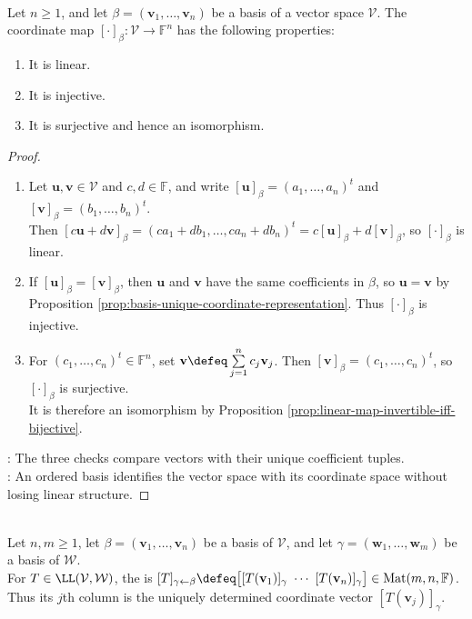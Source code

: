 \begin{proposition} \label{prop:coordinate-map-isomorphism} \\
Let $n\geq1$, and let $\beta=(\mathbf{v}_1,\ldots,\mathbf{v}_n)$ be a basis of a vector space $\mathcal{V}$. The coordinate map $[\cdot]_{\beta}:\mathcal{V}\to\mathbb{F}^n$ has the following properties:
\begin{enumerate}[label=(\roman*)]
\setlength{\itemsep}{0pt}
\item It is linear.
\item It is injective.
\item It is surjective and hence an isomorphism.
\end{enumerate}
\begin{proof}
\begin{enumerate}[label=(\roman*)]
\setlength{\itemsep}{0pt}
\item Let $\mathbf{u},\mathbf{v}\in\mathcal{V}$ and $c,d\in\mathbb{F}$, and write $[\mathbf{u}]_{\beta}=(a_1,\ldots,a_n)^t$ and $[\mathbf{v}]_{\beta}=(b_1,\ldots,b_n)^t$.\\
Then $[c\mathbf{u}+d\mathbf{v}]_{\beta}=(ca_1+db_1,\ldots,ca_n+db_n)^t=c[\mathbf{u}]_{\beta}+d[\mathbf{v}]_{\beta}$, so $[\cdot]_{\beta}$ is linear.
\item If $[\mathbf{u}]_{\beta}=[\mathbf{v}]_{\beta}$, then $\mathbf{u}$ and $\mathbf{v}$ have the same coefficients in $\beta$, so $\mathbf{u}=\mathbf{v}$ by Proposition \ref{prop:basis-unique-coordinate-representation}. Thus $[\cdot]_{\beta}$ is injective.
\item For $(c_1,\ldots,c_n)^t\in\mathbb{F}^n$, set $\mathbf{v}\defeq\sum\limits_{j=1}^{n}c_j\mathbf{v}_j$. Then $[\mathbf{v}]_{\beta}=(c_1,\ldots,c_n)^t$, so $[\cdot]_{\beta}$ is surjective.\\
It is therefore an isomorphism by Proposition \ref{prop:linear-map-invertible-iff-bijective}.
\end{enumerate}
: The three checks compare vectors with their unique coefficient tuples.\\
: An ordered basis identifies the vector space with its coordinate space without losing linear structure.
\end{proof}
\end{proposition}

\begin{definition} \label{def:matrix-representation-of-linear-map} \\
Let $n,m\geq1$, let $\beta=(\mathbf{v}_1,\ldots,\mathbf{v}_n)$ be a basis of $\mathcal{V}$, and let $\gamma=(\mathbf{w}_1,\ldots,\mathbf{w}_m)$ be a basis of $\mathcal{W}$.\\
For $T\in\LL(\mathcal{V},\mathcal{W})$, the  is $[T]_{\gamma\leftarrow\beta}\defeq\bigl[[T(\mathbf{v}_1)]_{\gamma}\ \cdots\ [T(\mathbf{v}_n)]_{\gamma}\bigr]\in\operatorname{Mat}(m,n,\mathbb{F})$.\\
Thus its $j$th column is the uniquely determined coordinate vector $[T(\mathbf{v}_j)]_{\gamma}$.
\end{definition}

